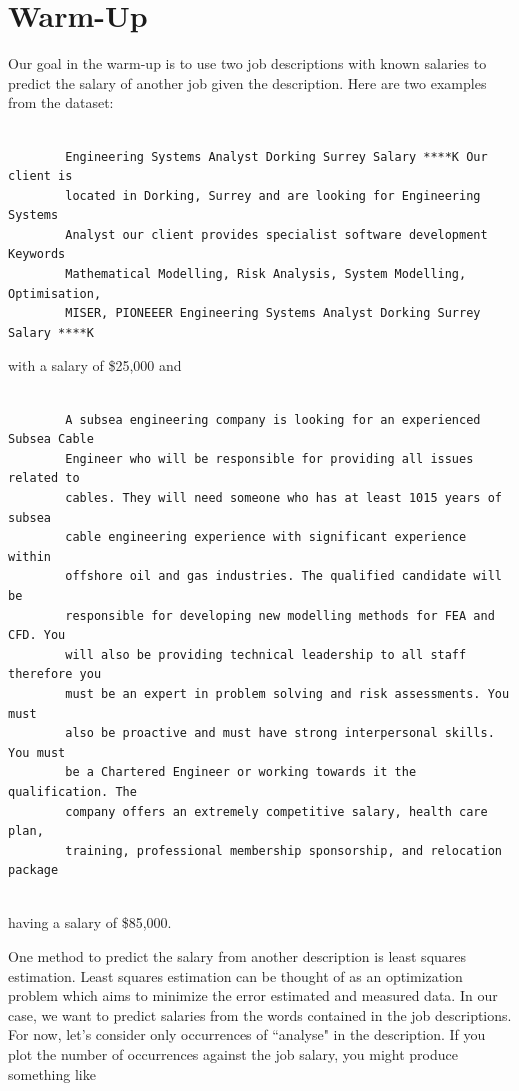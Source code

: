 \documentclass[12pt]{article}
\begin{document}
\section{Warm-Up}

    Our goal in the warm-up is to use two job descriptions with known
    salaries to predict the salary of another job given the description. Here
    are two examples from the dataset: 
    
    \begin{lstlisting}

        Engineering Systems Analyst Dorking Surrey Salary ****K Our client is
        located in Dorking, Surrey and are looking for Engineering Systems
        Analyst our client provides specialist software development Keywords
        Mathematical Modelling, Risk Analysis, System Modelling, Optimisation,
        MISER, PIONEEER Engineering Systems Analyst Dorking Surrey Salary ****K

    \end{lstlisting}

    with a salary of \$25,000 and 

    \begin{lstlisting}

        A subsea engineering company is looking for an experienced Subsea Cable
        Engineer who will be responsible for providing all issues related to
        cables. They will need someone who has at least 1015 years of subsea
        cable engineering experience with significant experience within
        offshore oil and gas industries. The qualified candidate will be
        responsible for developing new modelling methods for FEA and CFD. You
        will also be providing technical leadership to all staff therefore you
        must be an expert in problem solving and risk assessments. You must
        also be proactive and must have strong interpersonal skills. You must
        be a Chartered Engineer or working towards it the qualification. The
        company offers an extremely competitive salary, health care plan,
        training, professional membership sponsorship, and relocation package
    
    \end{lstlisting} having a salary of \$85,000.

    One method to predict the salary from another description is least squares
    estimation.  Least squares estimation can be thought of as an optimization
    problem which aims to minimize the error estimated and measured data.  In
    our case, we want to predict salaries from the words contained in the job
    descriptions.  For now, let's consider only occurrences of ``analyse" in
    the description.  If you plot the number of occurrences against the job
    salary, you might produce something like
    
\end{document}
